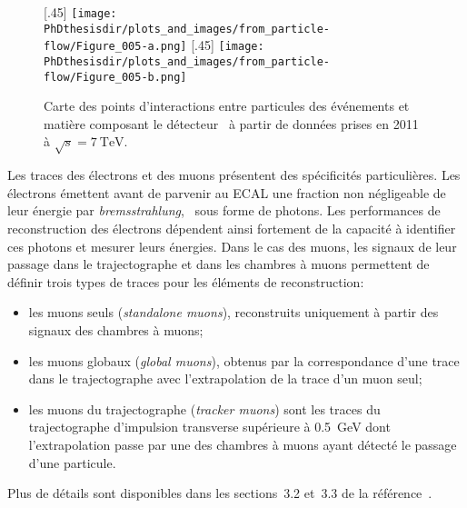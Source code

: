 \begin{figure}[h]
\centering
{}[.45\textwidth]
{\texttt{[image: \\PhDthesisdir/plots\_and\_images/from\_particle-flow/Figure\_005-a.png]}}
\hfill
{}[.45\textwidth]
{\texttt{[image: \\PhDthesisdir/plots\_and\_images/from\_particle-flow/Figure\_005-b.png]}}
\caption[Points d'interactions entre particules des événements et matière composant le détecteur.]{Carte des points d'interactions entre particules des événements et matière composant le détecteur~\cite{particle-flow,CMS-TRK-17-001} à partir de données prises en 2011 à $\sqrt{s}=\SI{7}{\TeV}$.}
\label{fig-chapter-LHC-section-evt_reco-subsec-PF_elements-CMS-self-radio}
\end{figure}
\par Les traces des électrons et des muons présentent des spécificités particulières.
Les électrons émettent avant de parvenir au ECAL une fraction non négligeable de leur énergie par \emph{bremsstrahlung}, \ie\ sous forme de photons.
Les performances de reconstruction des électrons dépendent ainsi fortement de la capacité à identifier ces photons et mesurer leurs énergies.
Dans le cas des muons, les signaux de leur passage dans le trajectographe et dans les chambres à muons permettent de définir trois types de traces pour les éléments de reconstruction:
\begin{itemize}
\item les muons seuls (\emph{standalone muons}), reconstruits uniquement à partir des signaux des chambres à muons;
\item les muons globaux (\emph{global muons}), obtenus par la correspondance d'une trace dans le trajectographe avec l'extrapolation de la trace d'un muon seul;
\item les muons du trajectographe (\emph{tracker muons}) sont les traces du trajectographe d'impulsion transverse supérieure à \SI{0.5}{\GeV} dont l'extrapolation passe par une des chambres à muons ayant détecté le passage d'une particule.
\end{itemize}
Plus de détails sont disponibles dans les sections~3.2 et~3.3 de la référence~\cite{particle-flow}.

